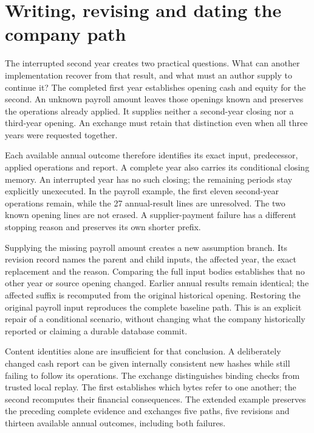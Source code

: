 \section{Writing, revising and dating the company path}
\label{sec:company-path-authoring}

The interrupted second year creates two practical questions. What can another
implementation recover from that result, and what must an author supply to
continue it? The completed first year establishes opening cash and equity for
the second. An unknown payroll amount leaves those openings known and preserves
the operations already applied. It supplies neither a second-year closing nor
a third-year opening. An exchange must retain that distinction even when all
three years were requested together.

Each available annual outcome therefore identifies its exact input, predecessor,
applied operations and report. A complete year also carries its conditional
closing memory. An interrupted year has no such closing; the remaining periods
stay explicitly unexecuted. In the payroll example, the first eleven second-year
operations remain, while the 27 annual-result lines are unresolved. The two
known opening lines are not erased. A supplier-payment failure has a different
stopping reason and preserves its own shorter prefix.

Supplying the missing payroll amount creates a new assumption branch. Its
revision record names the parent and child inputs, the affected year, the exact
replacement and the reason. Comparing the full input bodies establishes that
no other year or source opening changed. Earlier annual results remain
identical; the affected suffix is recomputed from the original historical
opening. Restoring the original payroll input reproduces the complete baseline
path. This is an explicit repair of a conditional scenario, without changing
what the company historically reported or claiming a durable database commit.

Content identities alone are insufficient for that conclusion. A deliberately
changed cash report can be given internally consistent new hashes while still
failing to follow its operations. The exchange distinguishes binding checks
from trusted local replay. The first establishes which bytes refer to one
another; the second recomputes their financial consequences. The extended
example preserves the preceding complete evidence and exchanges five paths,
five revisions and thirteen available annual outcomes, including both failures.

